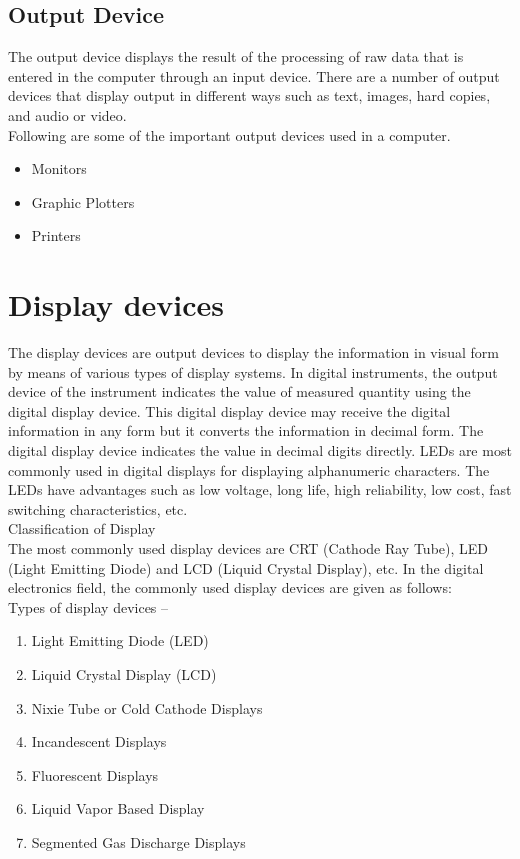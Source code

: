 \documentclass[11pt,a4paper,twoside]{article}
\begin{document}
\subsection{Output Device}
The output device displays the result of the processing of raw data that is entered in the computer through an input device. There are a number of output devices that display output in different ways such as text, images, hard copies, and audio or video.\\
Following are some of the important output devices used in a computer.
\begin{itemize}
    \item Monitors
\item Graphic Plotters
\item Printers
\end{itemize}
\section{Display devices}
The display devices are output devices to display the information in visual form by means of various types of display systems. In digital instruments, the output device of the instrument indicates the value of measured quantity using the digital display device. This digital display device may receive the digital information in any form but it converts the information in decimal form. The digital display device indicates the value in decimal digits directly. LEDs are most commonly used in digital displays for displaying alphanumeric characters. The LEDs have advantages such as low voltage, long life, high reliability, low cost, fast switching characteristics, etc.\\
Classification of Display\\
The most commonly used display devices are CRT (Cathode Ray Tube), LED (Light Emitting Diode) and LCD (Liquid Crystal Display), etc. In the digital electronics field, the commonly used display devices are given as follows:\\
Types of display devices –
\begin{enumerate}
    \item Light Emitting Diode (LED)
\item Liquid Crystal Display (LCD)
\item Nixie Tube or Cold Cathode Displays
\item Incandescent Displays
\item Fluorescent Displays
\item Liquid Vapor Based Display
\item Segmented Gas Discharge Displays	
\end{enumerate}
    
\end{document}
